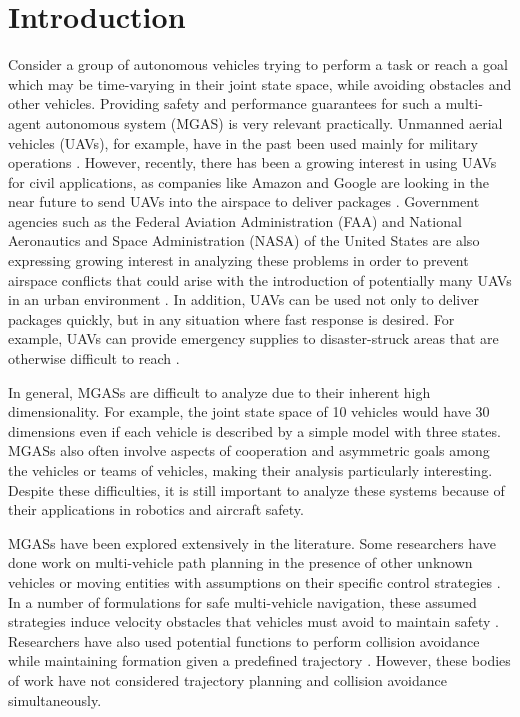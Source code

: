 \section{Introduction}
Consider a group of autonomous vehicles trying to perform a task or reach a goal which may be time-varying in their joint state space, while avoiding obstacles and other vehicles. Providing safety and performance guarantees for such a multi-agent autonomous system (MGAS) is very relevant practically. Unmanned aerial vehicles (UAVs), for example, have in the past been used mainly for military operations \cite{tice91}. However, recently, there has been a growing interest in using UAVs for civil applications, as companies like Amazon and Google are looking in the near future to send UAVs into the airspace to deliver packages \cite{primeAir,projectWing}. Government agencies such as the Federal Aviation Administration (FAA) and National Aeronautics and Space Administration (NASA) of the United States are also expressing growing interest in analyzing these problems in order to prevent airspace conflicts that could arise with the introduction of potentially many UAVs in an urban environment \cite{faa13}. In addition, UAVs can be used not only to deliver packages quickly, but in any situation where fast response is desired. For example, UAVs can provide emergency supplies to disaster-struck areas that are otherwise difficult to reach \cite{debusk10}.

In general, MGASs are difficult to analyze due to their inherent high dimensionality. For example, the joint state space of 10 vehicles would have 30 dimensions even if each vehicle is described by a simple model with three states. MGASs also often involve aspects of cooperation and asymmetric goals among the vehicles or teams of vehicles, making their analysis particularly interesting. Despite these difficulties, it is still important to analyze these systems because of their applications in robotics and aircraft safety.

MGASs have been explored extensively in the literature. Some researchers have done work on multi-vehicle path planning in the presence of other unknown vehicles or moving entities with assumptions on their specific control strategies \cite{chasparis05}. In a number of formulations for safe multi-vehicle navigation, these assumed strategies induce velocity obstacles that vehicles must avoid to maintain safety \cite{fiorini98, vandenberg08}. Researchers have also used potential functions to perform collision avoidance while maintaining formation given a predefined trajectory \cite{saber02,chuang07}. However, these bodies of work have not considered trajectory planning and collision avoidance simultaneously.

